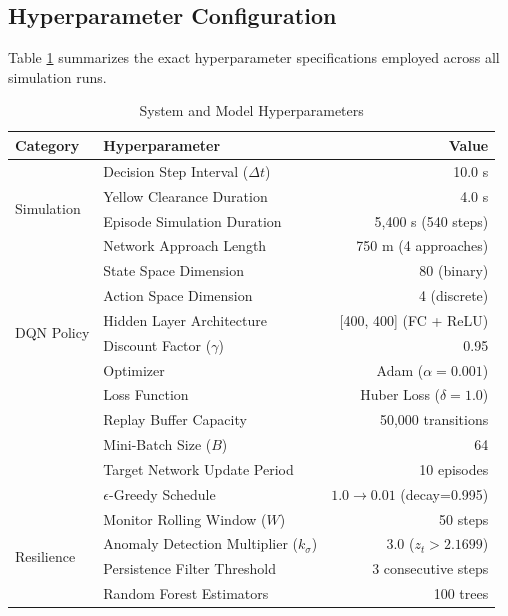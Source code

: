 \documentclass{ieeeaccess}
\begin{document}
\subsection{Hyperparameter Configuration}
Table \ref{tab:hyperparameters} summarizes the exact hyperparameter specifications employed across all simulation runs.

\begin{table}[!t]
\centering
\caption{System and Model Hyperparameters}
\label{tab:hyperparameters}
\scriptsize
\setlength{\tabcolsep}{3pt}
\begin{tabular}{llr}
\toprule
\textbf{Category} & \textbf{Hyperparameter} & \textbf{Value} \\
\midrule
\multirow{4}{*}{Simulation} 
 & Decision Step Interval ($\Delta t$) & 10.0 s \\
 & Yellow Clearance Duration & 4.0 s \\
 & Episode Simulation Duration & 5,400 s (540 steps) \\
 & Network Approach Length & 750 m (4 approaches) \\
\midrule
\multirow{6}{*}{DQN Policy} 
 & State Space Dimension & 80 (binary) \\
 & Action Space Dimension & 4 (discrete) \\
 & Hidden Layer Architecture & [400, 400] (FC + ReLU) \\
 & Discount Factor ($\gamma$) & 0.95 \\
 & Optimizer & Adam ($\alpha = 0.001$) \\
 & Loss Function & Huber Loss ($\delta = 1.0$) \\
 & Replay Buffer Capacity & 50,000 transitions \\
 & Mini-Batch Size ($B$) & 64 \\
 & Target Network Update Period & 10 episodes \\
 & $\epsilon$-Greedy Schedule & $1.0 \to 0.01$ (decay=0.995) \\
\midrule
\multirow{4}{*}{Resilience} 
 & Monitor Rolling Window ($W$) & 50 steps \\
 & Anomaly Detection Multiplier ($k_\sigma$) & 3.0 ($z_t > 2.1699$) \\
 & Persistence Filter Threshold & 3 consecutive steps \\
 & Random Forest Estimators & 100 trees \\
\bottomrule
\end{tabular}
\end{table}
\end{document}
